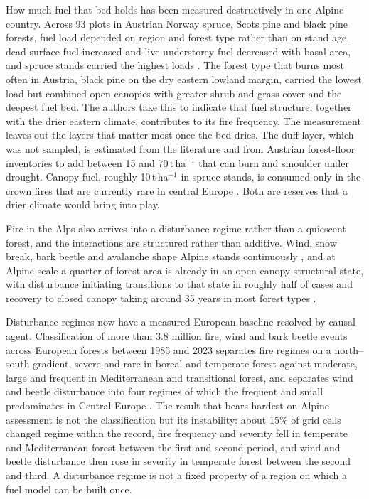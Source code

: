 \documentclass[11pt,a4paper]{article}
\begin{document}
How much fuel that bed holds has been measured destructively in one Alpine country. Across 93 plots in Austrian Norway spruce, Scots pine and black pine forests, fuel load depended on region and forest type rather than on stand age, dead surface fuel increased and live understorey fuel decreased with basal area, and spruce stands carried the highest loads \citep{neumann_fuel_2022}. The forest type that burns most often in Austria, black pine on the dry eastern lowland margin, carried the lowest load but combined open canopies with greater shrub and grass cover and the deepest fuel bed. The authors take this to indicate that fuel structure, together with the drier eastern climate, contributes to its fire frequency. The measurement leaves out the layers that matter most once the bed dries. The duff layer, which was not sampled, is estimated from the literature and from Austrian forest-floor inventories to add between 15 and 70\,t\,ha$^{-1}$ that can burn and smoulder under drought. Canopy fuel, roughly 10\,t\,ha$^{-1}$ in spruce stands, is consumed only in the crown fires that are currently rare in central Europe \citep{neumann_fuel_2022}. Both are reserves that a drier climate would bring into play.

Fire in the Alps also arrives into a disturbance regime rather than a quiescent forest, and the interactions are structured rather than additive. Wind, snow break, bark beetle and avalanche shape Alpine stands continuously \citep{bebi_changes_2017}, and at Alpine scale a quarter of forest area is already in an open-canopy structural state, with disturbance initiating transitions to that state in roughly half of cases and recovery to closed canopy taking around 35 years in most forest types \citep{stritih_alternative_2023}.

Disturbance regimes now have a measured European baseline resolved by causal agent. Classification of more than 3.8 million fire, wind and bark beetle events across European forests between 1985 and 2023 separates fire regimes on a north--south gradient, severe and rare in boreal and temperate forest against moderate, large and frequent in Mediterranean and transitional forest, and separates wind and beetle disturbance into four regimes of which the frequent and small predominates in Central Europe \citep{miguel_unravelling_2026}. The result that bears hardest on Alpine assessment is not the classification but its instability: about 15\% of grid cells changed regime within the record, fire frequency and severity fell in temperate and Mediterranean forest between the first and second period, and wind and beetle disturbance then rose in severity in temperate forest between the second and third. A disturbance regime is not a fixed property of a region on which a fuel model can be built once.
\end{document}
